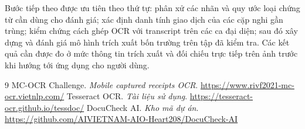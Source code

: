 \documentclass[11pt,a4paper]{article}
\begin{document}
Bước tiếp theo được ưu tiên theo thứ tự: phân xử các nhãn và quy ước loại chứng từ cần dùng cho đánh giá; xác định danh tính giao dịch của các cặp nghi gần trùng; kiểm chứng cách ghép OCR với transcript trên các ca đại diện; sau đó xây dựng và đánh giá mô hình trích xuất bốn trường trên tập đã kiểm tra. Các kết quả cần được đo ở mức thông tin trích xuất và đối chiếu trực tiếp trên ảnh trước khi hướng tới ứng dụng cho người dùng.

\begin{thebibliography}{9}
 MC-OCR Challenge. \textit{Mobile captured receipts OCR}.\newline
\url{https://www.rivf2021-mc-ocr.vietnlp.com/}
 Tesseract OCR. \textit{Tài liệu sử dụng}.\newline
\url{https://tesseract-ocr.github.io/tessdoc/}
 DocuCheck AI. \textit{Kho mã dự án}.\newline
\url{https://github.com/AIVIETNAM-AIO-Heart208/DocuCheck-AI}
\end{thebibliography}
\end{document}
